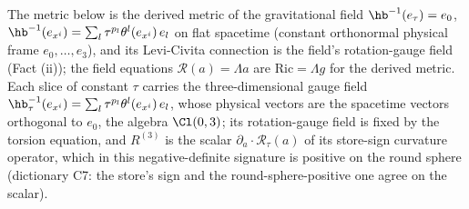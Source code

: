 The metric below is the derived metric of the gravitational field $\hb^{-1}(e_{\tau}) = e_{0}$, $\hb^{-1}(e_{x^{i}}) = \sum_{l}\tau^{p_{l}}\theta^{l}(e_{x^{i}})\,e_{l}$ on flat spacetime (constant orthonormal physical frame $e_{0}, \dots, e_{3}$), and its Levi-Civita connection is the field's rotation-gauge field (Fact (ii)); the field equations $\mathcal{R}(a) = \Lambda a$ are $\mathrm{Ric} = \Lambda g$ for the derived metric. Each slice of constant $\tau$ carries the three-dimensional gauge field $\hb_{\tau}^{-1}(e_{x^{i}}) = \sum_{l}\tau^{p_{l}}\theta^{l}(e_{x^{i}})\,e_{l}$, whose physical vectors are the spacetime vectors orthogonal to $e_{0}$, the algebra $\Cl(0,3)$; its rotation-gauge field is fixed by the torsion equation, and $R^{(3)}$ is the scalar $\partial_{a}\cdot\mathcal{R}_{\tau}(a)$ of its store-sign curvature operator, which in this negative-definite signature is positive on the round sphere (dictionary C7: the store's sign and the round-sphere-positive one agree on the scalar).

